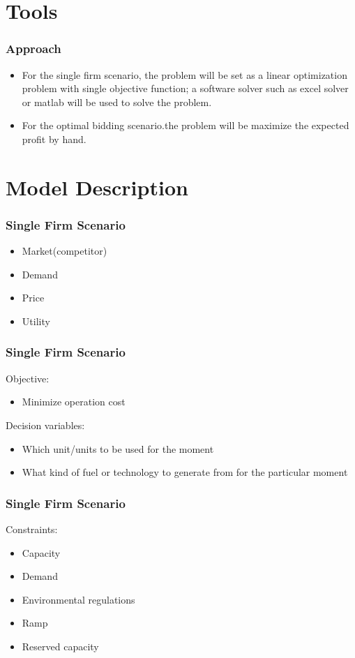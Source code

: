\documentclass[compress,handout,10pt]{beamer}
\let\olditem\item
\renewcommand{\item}{\setlength{\itemsep}{0.5\baselineskip}\olditem}
\begin{document}
\section{Tools}
\begin{frame}
    \frametitle{Approach}
    \begin{itemize}
    \item For the single firm scenario, the problem will be set as a linear optimization problem with single objective function; a software solver such as excel solver or matlab will be used to solve the problem.
    \item For the optimal bidding scenario.the problem will be maximize the expected profit by hand.
    \end{itemize}
\end{frame}

\section{Model Description}

\begin{frame}
    \frametitle{Single Firm Scenario}
     \begin{itemize}
     \item Market(competitor)
     \item Demand
     \item Price
     \item Utility 
     \end{itemize}    
\end{frame}


\begin{frame}
    \frametitle{Single Firm Scenario}
     Objective:
     \begin{itemize}
     \item Minimize operation cost
     \end{itemize}
     Decision variables:
     \begin{itemize}
     \item Which unit/units to be used for the moment
     \item What kind of fuel or technology to generate from for the particular moment
     \end{itemize}    
\end{frame}

\begin{frame}
    \frametitle{Single Firm Scenario}
     Constraints:
     \begin{itemize}
     \item Capacity
     \item Demand
     \item Environmental regulations
     \item Ramp
     \item Reserved capacity
     \end{itemize}
\end{frame}
\end{document}
